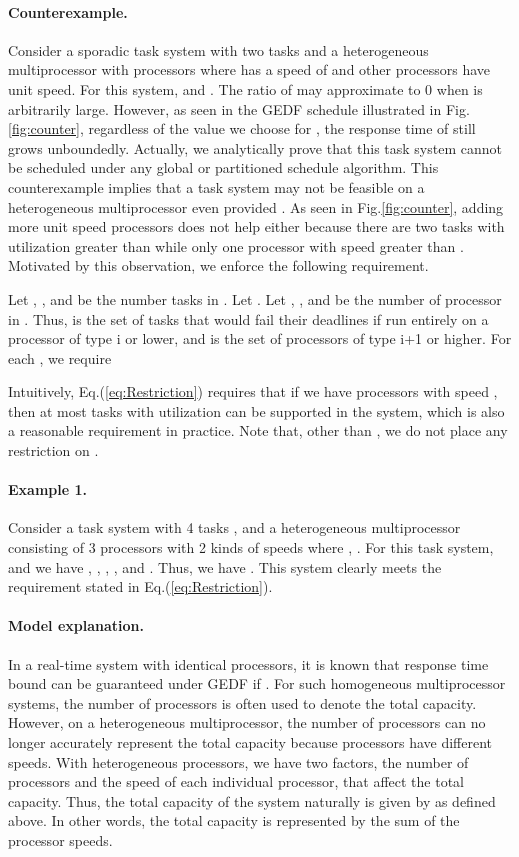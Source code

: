 \documentclass[Times, 10pt,twocolumn]{article}
\theoremstyle{definition}
\begin{document}
\paragraph{Counterexample.} Consider a sporadic task system with two tasks  and a heterogeneous multiprocessor with  processors where  has a speed of  and other  processors have unit speed. For this system,  and . The ratio of  may approximate to 0 when  is arbitrarily large. However, as seen in the GEDF schedule illustrated in Fig.\ref{fig:counter}, regardless of the value we choose for , the response time of  still grows unboundedly. Actually, we analytically prove that this task system cannot be scheduled under any global or partitioned schedule algorithm. This counterexample implies that a task system may not be feasible on a heterogeneous multiprocessor even provided . As seen in Fig.\ref{fig:counter}, adding more unit speed processors  does not help either because there are two tasks with utilization greater than  while only one processor with speed greater than . Motivated by this observation, we enforce the following requirement.

Let , , and  be the number tasks in . Let . Let , ,  and  be the number of processor in . Thus,  is the set of tasks that would fail their deadlines if run entirely on a processor of type i or lower, and  is the set of processors of type i+1 or higher. For each , we require

Intuitively, Eq.(\ref{eq:Restriction}) requires that if we have  processors with speed , then at most  tasks with utilization 
can be supported in the system, which is also a reasonable requirement in practice. Note that, other than , we do not place any restriction on .

\paragraph{Example 1.} Consider a task system with 4 tasks , and a heterogeneous multiprocessor consisting of 3 processors with 2 kinds of speeds where , . For this task system,  and we have , ,  , , and . Thus, we have . This system clearly meets the requirement stated in Eq.(\ref{eq:Restriction}). 

\paragraph{Model explanation.}
\label{sec:explanation}

In a real-time system with  identical processors, it is known that response time bound can be guaranteed under GEDF if  \cite{Devi}.
For such homogeneous multiprocessor systems, the number of processors is often used to denote the total capacity. However, on a heterogeneous multiprocessor, the number of processors can no longer accurately represent the total capacity because processors have different speeds. With heterogeneous processors, we have two factors, the number of processors and the speed of each individual processor, that affect the total capacity. Thus, the total capacity of the system naturally is given by  as defined above. In other words, the total capacity is represented by the sum of the processor speeds.
\end{document}
